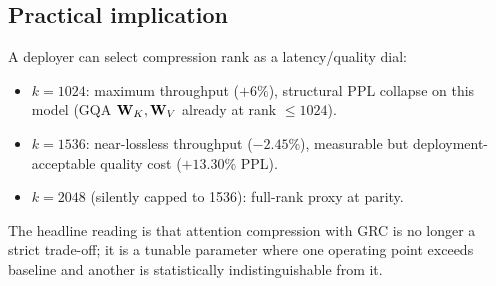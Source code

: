 \documentclass[11pt]{article}
\begin{document}
\subsection{Practical implication}

A deployer can select compression rank as a latency/quality dial:
\begin{itemize}
\item $k{=}1024$: maximum throughput ($+6\%$), structural PPL collapse on
this model (GQA $\mathbf{W}_K,\mathbf{W}_V$ already at rank $\leq 1024$).
\item $k{=}1536$: near-lossless throughput ($-2.45\%$), measurable but
deployment-acceptable quality cost ($+13.30\%$ PPL).
\item $k{=}2048$ (silently capped to 1536): full-rank proxy at parity.
\end{itemize}
The headline reading is that attention compression with GRC is no longer a
strict trade-off; it is a tunable parameter where one operating point
exceeds baseline and another is statistically indistinguishable from it.

\printbibliography
\end{document}
